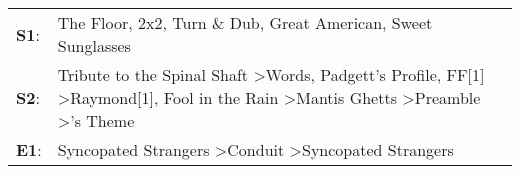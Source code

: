 \begin{supertabular}{p{0.03\textwidth}p{0.92\textwidth}}
 \textbf{S1}:  &                                                                                                                                                                                                                                            The Floor\textsuperscript{}, \enspace 2x2\textsuperscript{}, \enspace Turn \& Dub\textsuperscript{}, \enspace Great American\textsuperscript{}, \enspace Sweet Sunglasses\textsuperscript{}  \enspace  \\
 \textbf{S2}:  &  Tribute to the Spinal Shaft\textsuperscript{} \textgreater \enspace Words\textsuperscript{}, \enspace Padgett's Profile\textsuperscript{}, \enspace FF[1]\textsuperscript{} \textgreater \enspace Raymond[1]\textsuperscript{}, \enspace Fool in the Rain\textsuperscript{} \textgreater \enspace Mantis Ghetts\textsuperscript{} \textgreater \enspace Preamble\textsuperscript{} \textgreater {}'s Theme\textsuperscript{}  \enspace  \\
 \textbf{E1}:  &                                                                                                                                                                                                                                                                                    Syncopated Strangers\textsuperscript{} \textgreater \enspace Conduit\textsuperscript{} \textgreater \enspace Syncopated Strangers\textsuperscript{}  \enspace  \\
\end{supertabular}
